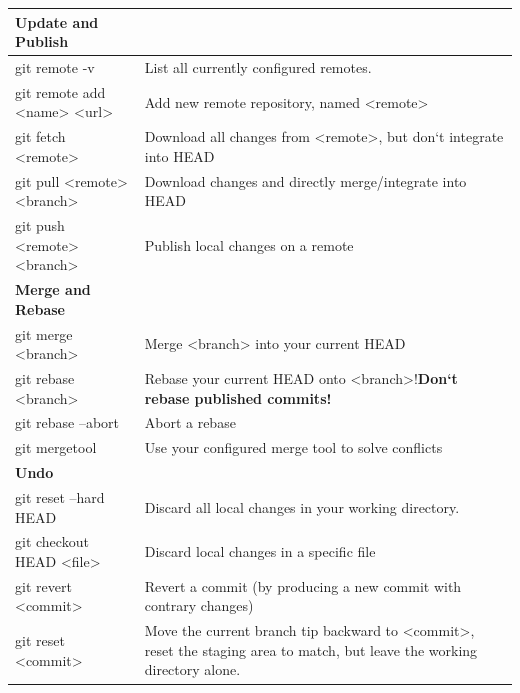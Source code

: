 \begin{longtable}{| p{} | p{} |}
	\textbf{Update and Publish}&
	\\\hline 
	
	\hline
	git remote -v&
	List all currently configured remotes.
	\\ \hline 
	
	git remote add <name> <url>& 
	Add new remote repository, named <remote>
	\\ \hline 
	
	git fetch <remote>&  
	Download all changes from <remote>,
	but don‘t integrate into HEAD
	\\ \hline
	
	git pull <remote> <branch>&
	Download changes and directly merge/integrate into HEAD  
	\\ \hline 
	
	git push <remote> <branch>&
	Publish local changes on a remote
	\\ \hline \hline
	
	\textbf{ Merge and Rebase}&
	\\\hline 
	
	\hline
	git merge <branch>&
	Merge <branch> into your current HEAD
	\\ \hline 
	
	git rebase <branch>& 
	Rebase your current HEAD onto <branch>!\textbf{Don‘t rebase published commits!}
	\\ \hline 
	
	git rebase --abort&
	Abort a rebase
	\\ \hline 
	
	git mergetool& 
	Use your configured merge tool to solve conflicts
	\\ \hline \hline
	
	\textbf{Undo}&
	\\\hline 
	
	\hline
	git reset --hard HEAD&
	Discard all local changes in your working directory.
	\\ \hline  
	
	git checkout HEAD <file>&
	Discard local changes in a specific file
	\\ \hline   
	
	git revert <commit>&
	Revert a commit (by producing a new commit with contrary changes)
	\\ \hline    
	
	git reset <commit>&
	Move the current branch tip backward to <commit>, reset the staging area to match, but leave the working directory alone. 
	\\ \hline
\end{longtable}
\clearpage


